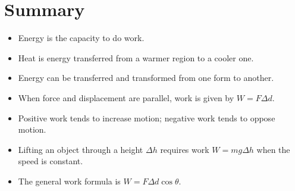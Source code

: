 \section{Summary}
\begin{itemize}
    \item Energy is the capacity to do work.
    \item Heat is energy transferred from a warmer region to a cooler one.
    \item Energy can be transferred and transformed from one form to another.
    \item When force and displacement are parallel, work is given by $W = F \Delta d$.
    \item Positive work tends to increase motion; negative work tends to oppose motion.
    \item Lifting an object through a height $\Delta h$ requires work $W = mg \Delta h$ when the speed is constant.
    \item The general work formula is $W = F \Delta d \cos \theta$.
\end{itemize}


